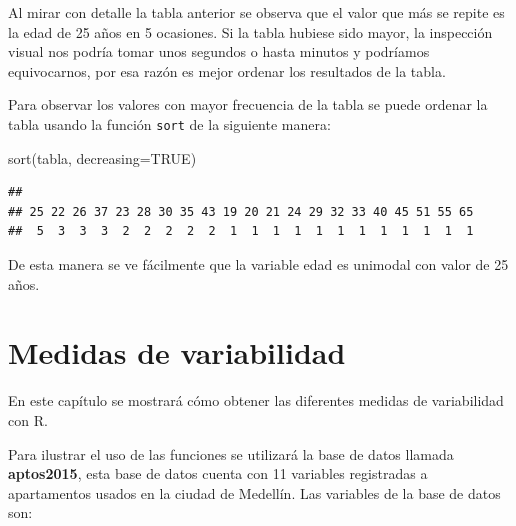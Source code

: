 \documentclass[
]{book}
\makeatletter
\newenvironment{Shaded}{\begin{snugshade}}{\end{snugshade}}
\newcommand{\AttributeTok}[1]{\textcolor[rgb]{0.77,0.63,0.00}{#1}}
\newcommand{\ConstantTok}[1]{\textcolor[rgb]{0.00,0.00,0.00}{#1}}
\newcommand{\FunctionTok}[1]{\textcolor[rgb]{0.00,0.00,0.00}{#1}}
\newcommand{\NormalTok}[1]{#1}
\newenvironment{kframe}{%
\medskip{}
\setlength{\fboxsep}{.8em}
 \def\at@end@of@kframe{}%
 \ifinner\ifhmode%
  \def\at@end@of@kframe{\end{minipage}}%
  \begin{minipage}{\columnwidth}%
 \fi\fi%
 \def\FrameCommand##1{\hskip\@totalleftmargin \hskip-\fboxsep
 \colorbox{shadecolor}{##1}\hskip-\fboxsep
     \hskip-\linewidth \hskip-\@totalleftmargin \hskip\columnwidth}%
 \MakeFramed {\advance\hsize-\width
   \@totalleftmargin\z@ \linewidth\hsize
   \@setminipage}}%
 {\par\unskip\endMakeFramed%
 \at@end@of@kframe}
\renewenvironment{Shaded}{\begin{kframe}}{\end{kframe}}
\makeatother
\begin{document}
Al mirar con detalle la tabla anterior se observa que el valor que más se repite es la edad de 25 años en 5 ocasiones. Si la tabla hubiese sido mayor, la inspección visual nos podría tomar unos segundos o hasta minutos y podríamos equivocarnos, por esa razón es mejor ordenar los resultados de la tabla.

Para observar los valores con mayor frecuencia de la tabla se puede ordenar la tabla usando la función \texttt{sort} de la siguiente manera:

\begin{Shaded}
\begin{Highlighting}[]
\FunctionTok{sort}\NormalTok{(tabla, }\AttributeTok{decreasing=}\ConstantTok{TRUE}\NormalTok{)}
\end{Highlighting}
\end{Shaded}

\begin{verbatim}
## 
## 25 22 26 37 23 28 30 35 43 19 20 21 24 29 32 33 40 45 51 55 65 
##  5  3  3  3  2  2  2  2  2  1  1  1  1  1  1  1  1  1  1  1  1
\end{verbatim}

De esta manera se ve fácilmente que la variable edad es unimodal con valor de 25 años.

\hypertarget{varia}{%
\chapter{Medidas de variabilidad}\label{varia}}

En este capítulo se mostrará cómo obtener las diferentes medidas de variabilidad con R.

Para ilustrar el uso de las funciones se utilizará la base de datos llamada \textbf{aptos2015}, esta base de datos cuenta con 11 variables registradas a apartamentos usados en la ciudad de Medellín. Las variables de la base de datos son:
\end{document}
